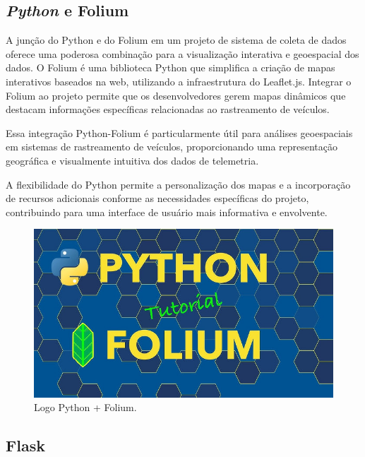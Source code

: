     
     \subsection{\textit{Python} e Folium} A junção do Python e do Folium em um projeto de sistema de coleta de dados oferece uma poderosa combinação para a visualização interativa e geoespacial dos dados. O Folium é uma biblioteca Python que simplifica a criação de mapas interativos baseados na web, utilizando a infraestrutura do Leaflet.js. Integrar o Folium ao projeto permite que os desenvolvedores gerem mapas dinâmicos que destacam informações específicas relacionadas ao rastreamento de veículos.

    Essa integração Python-Folium é particularmente útil para análises geoespaciais em sistemas de rastreamento de veículos, proporcionando uma representação geográfica e visualmente intuitiva dos dados de telemetria. 
    
    A flexibilidade do Python permite a personalização dos mapas e a incorporação de recursos adicionais conforme as necessidades específicas do projeto, contribuindo para uma interface de usuário mais informativa e envolvente.

      \begin{figure}[hp]
    \centering
    
    \includegraphics[scale=0.1]{figures/python_folium.jpg}
    
    \caption{Logo Python + Folium.}
\end{figure}


    \subsection{Flask}


